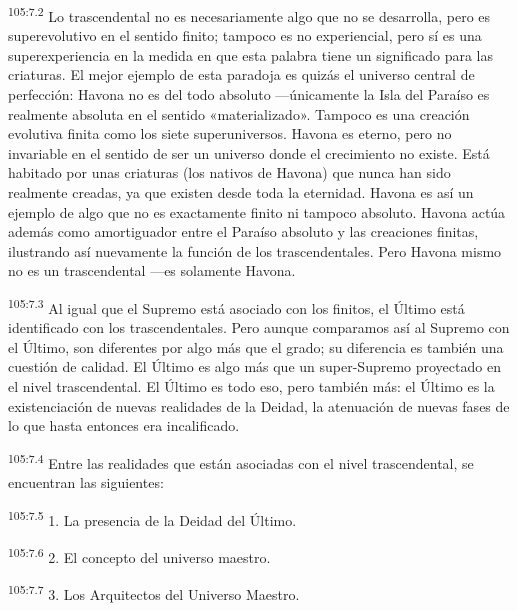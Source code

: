 \par
\textsuperscript{105:7.2} Lo trascendental no es necesariamente algo que no se desarrolla, pero es superevolutivo en el sentido finito; tampoco es no experiencial, pero sí es una superexperiencia en la medida en que esta palabra tiene un significado para las criaturas. El mejor ejemplo de esta paradoja es quizás el universo central de perfección: Havona no es del todo absoluto ---únicamente la Isla del Paraíso es realmente absoluta en el sentido «materializado». Tampoco es una creación evolutiva finita como los siete superuniversos. Havona es eterno, pero no invariable en el sentido de ser un universo donde el crecimiento no existe. Está habitado por unas criaturas (los nativos de Havona) que nunca han sido realmente creadas, ya que existen desde toda la eternidad. Havona es así un ejemplo de algo que no es exactamente finito ni tampoco absoluto. Havona actúa además como amortiguador entre el Paraíso absoluto y las creaciones finitas, ilustrando así nuevamente la función de los trascendentales. Pero Havona mismo no es un trascendental ---es solamente Havona.

\par
\textsuperscript{105:7.3} Al igual que el Supremo está asociado con los finitos, el
Último está identificado con los trascendentales. Pero aunque comparamos así al Supremo con el Último, son diferentes por algo más que el grado; su diferencia es también una cuestión de calidad. El Último es algo más que un super-Supremo proyectado en el nivel trascendental. El Último es todo eso, pero también más: el Último es la existenciación de nuevas realidades de la Deidad, la atenuación de nuevas fases de lo que hasta entonces era incalificado.

\par
\textsuperscript{105:7.4} Entre las realidades que están asociadas con el nivel trascendental, se encuentran las siguientes:

\par
\textsuperscript{105:7.5} 1. La presencia de la Deidad del Último.

\par
\textsuperscript{105:7.6} 2. El concepto del universo maestro.

\par
\textsuperscript{105:7.7} 3. Los Arquitectos del Universo Maestro.

